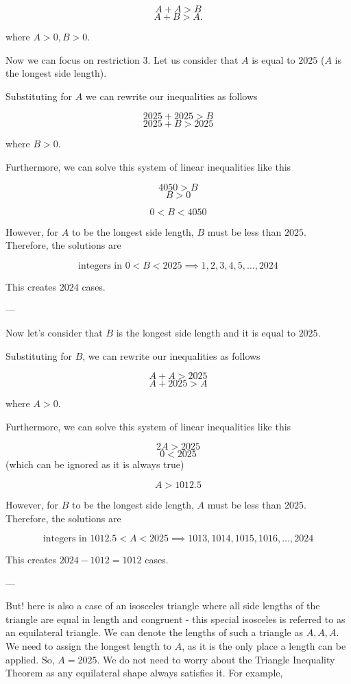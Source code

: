 \begin{enumerate}
 
 \[A + A > B\] 
 \[A + B > A.\]

 where $A > 0, B > 0.$

 Now we can focus on restriction $3.$ Let us consider that $A$ is equal to $2025$ ($A$ is the longest side length).

 Substituting for $A$ we can rewrite our inequalities as follows

 
 \[2025 + 2025 > B\] 
 \[2025 + B > 2025\]

 where $B > 0.$

 Furthermore, we can solve this system of linear inequalities like this

 
 \[4050 > B\] 
 \[B > 0\]

 \[0 < B < 4050\]

 However, for $A$ to be the longest side length, $B$ must be less than $2025$. Therefore, the solutions are

 
 \[\text{integers in } 0 < B < 2025 \implies 1, 2, 3, 4, 5, \ldots, 2024\]

 This creates $2024$ cases.

 ---

 Now let’s consider that $B$ is the longest side length and it is equal to $2025$.

 Substituting for $B$, we can rewrite our inequalities as follows

 
 \[A + A > 2025\] 
 \[A + 2025 > A\]

 where $A > 0.$

 Furthermore, we can solve this system of linear inequalities like this

 
 \[2A > 2025\] 
 \[0 < 2025\] (which can be ignored as it is always true)

 
 \[A > 1012.5\]

 However, for $B$ to be the longest side length, $A$ must be less than $2025$. Therefore, the solutions are

 
 \[\text{integers in } 1012.5 < A < 2025 \implies 1013, 1014, 1015, 1016, \ldots, 2024\]

 This creates $2024 - 1012 = 1012$ cases.

 ---

 But! here is also a case of an isosceles triangle where all side lengths of the triangle are equal in length and congruent - this special isosceles is referred to as an equilateral triangle. We can denote the lengths of such a triangle as $A, A, A$. We need to assign the longest length to $A$, as it is the only place a length can be applied. So, $A = 2025$. We do not need to worry about the Triangle Inequality Theorem as any equilateral shape always satisfies it. For example,


\end{enumerate}

